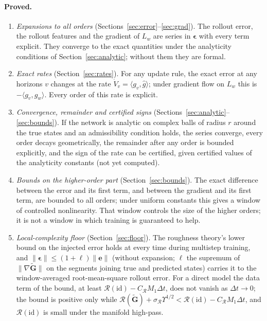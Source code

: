 \documentclass[11pt]{article}
\theoremstyle{definition}
\theoremstyle{remark}
\newcommand{\ee}{\mathbf{e}}
\newcommand{\Gt}{\tilde{\mathbf{G}}}
\newcommand{\eps}{\bm{\epsilon}}
\newcommand{\Rgh}{\mathcal{R}}
\newcommand{\dt}{\Delta t}
\begin{document}
\paragraph{Proved.}
\begin{enumerate}
\item \emph{Expansions to all orders} (Sections~\ref{sec:error}--\ref{sec:grad}). The rollout error, the rollout features and the gradient of $L_w$ are series in $\eps$ with every term explicit. They converge to the exact quantities under the analyticity conditions of Section~\ref{sec:analytic}; without them they are formal.
\item \emph{Exact rates} (Section~\ref{sec:rates}). For any update rule, the exact error at any horizons $v$ changes at the rate $\dot V_v=\langle g_v,\hat g\rangle$; under gradient flow on $L_w$ this is $-\langle g_v,g_w\rangle$. Every order of this rate is explicit.
\item \emph{Convergence, remainder and certified signs} (Sections~\ref{sec:analytic}--\ref{sec:bounds}). If the network is analytic on complex balls of radius $r$ around the true states and an admissibility condition holds, the series converge, every order decays geometrically, the remainder after any order is bounded explicitly, and the sign of the rate can be certified, given certified values of the analyticity constants (not yet computed).
\item \emph{Bounds on the higher-order part} (Section~\ref{sec:bounds}). The exact difference between the error and its first term, and between the gradient and its first term, are bounded to all orders; under uniform constants this gives a window of controlled nonlinearity. That window controls the size of the higher orders; it is not a window in which training is guaranteed to help.
\item \emph{Local-complexity floor} (Section~\ref{sec:floor}). The roughness theory's lower bound on the injected error holds at every time during multistep training, and $\|\eps\|\le(1+\ell)\|\ee\|$ (without expansion; $\ell$ the supremum of $\|\nabla\Gt\|$ on the segments joining true and predicted states) carries it to the window-averaged root-mean-square rollout error. For a direct model the data term of the bound, at least $\Rgh(\mathrm{id})-C_\Rgh M_1\dt$, does not vanish as $\dt\to0$; the bound is positive only while $\Rgh(\Gt)+\sigma_\Rgh\Upsilon^{1/2}<\Rgh(\mathrm{id})-C_\Rgh M_1\dt$, and $\Rgh(\mathrm{id})$ is small under the manifold high-pass.
\end{enumerate}
\end{document}
